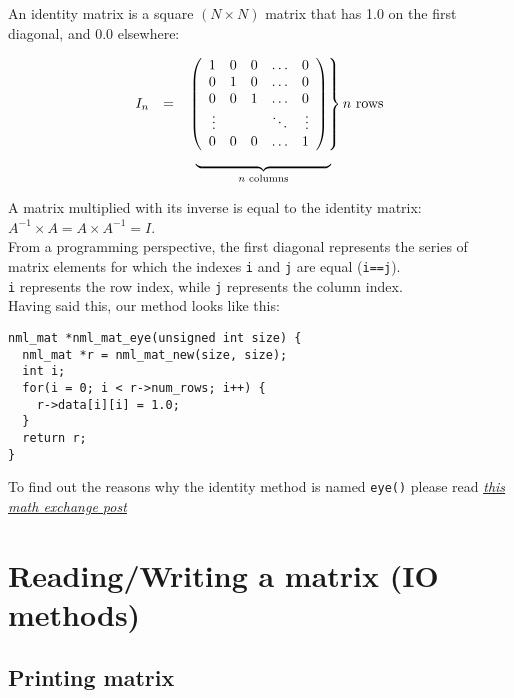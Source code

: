 An identity matrix is a square $(N\times N)$ matrix that has 1.0 on the first diagonal, and 0.0 elsewhere:

$$
\begin{array}{rcl}
I_n & = &
\left. \left( \begin{array}{rrrcr}
1 & 0 & 0 & \ldots & 0 \\
0 & 1 & 0 & \ldots & 0 \\
0 & 0 & 1 & \ldots & 0 \\
\vdots & & & \ddots & \vdots \\
0 & 0 & 0 & \ldots & 1
\end{array} \right) \right\} {n \textrm{ rows}}
\\
& & \hspace{2mm}\underbrace{\hspace*{34mm}}_{\normalsize n \text{ columns}}
\end{array}
$$

A matrix multiplied with its inverse is equal to the identity matrix:\quad  $A^{-1} \times A = A \times A^{-1} = I$.
\\

From a programming perspective, the first diagonal represents the series of matrix elements for which the indexes {\tt i} and {\tt j} are equal ({\tt i==j}).
\\

{\tt i} represents the row index, while {\tt j} represents the column index.
\\

Having said this, our method looks like this:

\begin{verbatim}
nml_mat *nml_mat_eye(unsigned int size) {
  nml_mat *r = nml_mat_new(size, size);
  int i;
  for(i = 0; i < r->num_rows; i++) {
    r->data[i][i] = 1.0;
  }
  return r;
}
\end{verbatim}

To find out the reasons why the identity method is named {\tt eye()} please read \href{https://math.stackexchange.com/questions/3028394/what-is-the-motivation-behind-naming-identity-matrix-as-eye/3028999}{\underline{\itshape this math exchange post}}

\section{Reading/Writing a matrix (IO methods)}

\subsection{Printing matrix}

